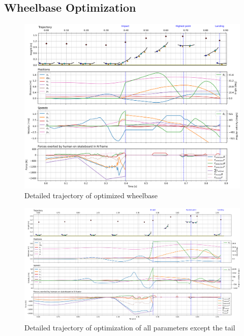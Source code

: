 \documentclass[default,iicol]{sn-jnl}
\begin{document}
\subsection{Wheelbase Optimization}
%
\begin{figure}
    \centering
    \includegraphics[trim={0cm 0cm 0cm 0cm},clip,width=\textwidth]{paper/figure/Fig7.png}    
    \caption[Trajectory, positions, speeds, and forces for wheelbase optimization]{Detailed trajectory of optimized wheelbase}\label{f_wheelbase}
\end{figure}
\begin{figure}
    \centering
    \includegraphics[trim={0cm 0cm 0cm 0cm},clip,width=\textwidth]{paper/figure/Fig8.png}
    \caption[Trajectory, positions, speeds, and forces for `all except tail length' optimization]{Detailed trajectory of optimization of all parameters except the tail}\label{f_notail}
\end{figure}
\end{document}
